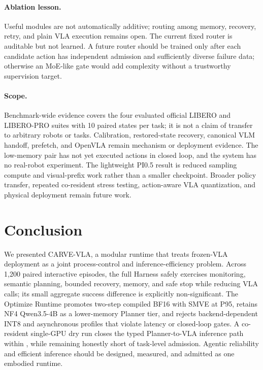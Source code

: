 \documentclass[runningheads]{waica}
\newcommand{\method}{CARVE-VLA}
\begin{document}
\paragraph{Ablation lesson.}
Useful modules are not automatically additive; routing among memory, recovery,
retry, and plain VLA execution remains open. The current fixed router is
auditable but not learned. A future router should be trained only after each
candidate action has independent admission and sufficiently diverse failure
data; otherwise an MoE-like gate would add complexity without a trustworthy
supervision target.

\paragraph{Scope.}
Benchmark-wide evidence covers the four evaluated official LIBERO and
LIBERO-PRO suites with 10 paired states per task; it is not a claim of transfer
to arbitrary robots or tasks. Calibration, restored-state recovery, canonical
VLM handoff, prefetch, and OpenVLA remain mechanism or deployment evidence.
The low-memory pair has not yet executed actions in closed loop, and the system
has no real-robot experiment. The lightweight PI0.5 result is reduced sampling
compute and visual-prefix work rather than a smaller checkpoint. Broader policy
transfer, repeated co-resident stress testing, action-aware VLA quantization,
and physical deployment remain future work.

\section{Conclusion}
\label{sec:conclusion}

We presented \method{}, a modular runtime that treats frozen-VLA deployment as
a joint process-control and inference-efficiency problem. Across 1,200 paired
interactive episodes, the full Harness safely exercises monitoring, semantic
planning, bounded recovery, memory, and safe stop while reducing VLA calls;
its small aggregate success difference is explicitly non-significant. The
Optimize Runtime promotes two-step compiled BF16 with SMVE at
\CarveFinalSmvePninetyfive{} P95, retains NF4 Qwen3.5-4B as a
\CarvePlannerNfMemoryReduction{} lower-memory Planner tier, and rejects
backend-dependent INT8 and asynchronous profiles that violate latency or
closed-loop gates. A co-resident single-GPU dry run closes the typed
Planner-to-VLA inference path within \CarveLowMemoryPair{}, while remaining
honestly short of task-level admission. Agentic reliability and efficient
inference should be designed, measured, and admitted as one embodied runtime.
\end{document}

